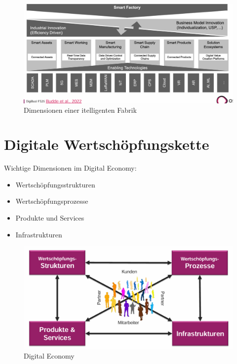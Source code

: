 \documentclass[../Main.tex]{subfiles}
\begin{document}
\begin{figure}[H]
    \centering
    \includegraphics[width=1\linewidth]{Images/digbus/sfdimensionen.png}
    \caption{Dimensionen einer itelligenten Fabrik}
\end{figure}

\section{Digitale Wertschöpfungskette}
Wichtige Dimensionen im Digital Economy:
\begin{itemize}
    \item Wertschöpfungsstrukturen
    \item Wertschöpfungsprozesse
    \item Produkte und Services
    \item Infrastrukturen
\end{itemize}
\begin{figure}[H]
    \centering
    \includegraphics[width=1\linewidth]{Images/digbus/digeconomy.png}
    \caption{Digital Economy}
\end{figure}
\end{document}
